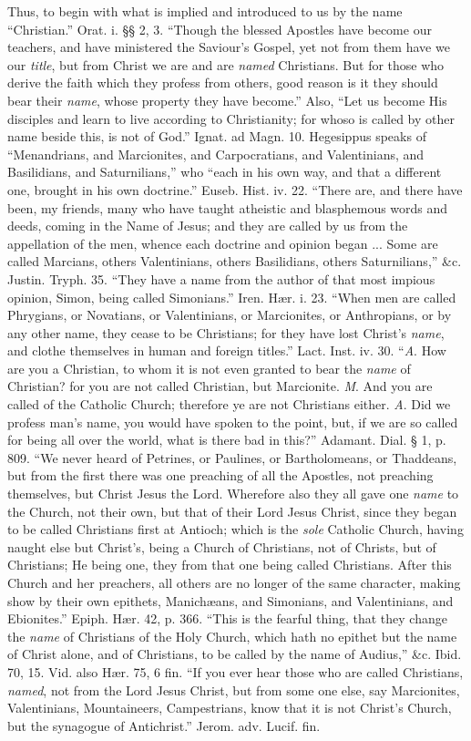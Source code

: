 Thus, to begin with what is implied and
introduced to us by the name ``Christian.'' Orat. i. §§ 2, 3. ``Though
the blessed Apostles have become our teachers, and have ministered the
Saviour's Gospel, yet not from them have we our \emph{title},
but from Christ we are and are \emph{named}
Christians. But for those who derive the faith which they
profess from others, good reason is it they should bear their \emph{name},
whose property they have become.'' Also, ``Let us become His
disciples and learn to live according to Christianity; for whoso is
called by other name beside this, is not of God.'' Ignat. ad Magn. 10.
Hegesippus speaks of ``Menandrians, and Marcionites, and Carpocratians,
and Valentinians, and Basilidians, and Saturnilians,'' who ``each in his
own way, and that a different one, brought in his own doctrine.'' Euseb.
Hist. iv. 22. ``There are, and there have been, my friends, many who
have taught atheistic and blasphemous words and deeds, coming in the
Name of Jesus; and they are called by us from the appellation of the
men, whence each doctrine and opinion began ... Some are called
Marcians, others Valentinians, others Basilidians, others Saturnilians,''
\&c. Justin. Tryph. 35. ``They have a name from the author of that
most impious opinion, Simon, being called Simonians.'' Iren. Hær. i.
23. ``When men are called Phrygians, or Novatians, or Valentinians, or
Marcionites, or Anthropians, or by any other name, they cease to be
Christians; for they have lost Christ's \emph{name},
and clothe themselves in human and foreign titles.'' Lact. Inst.
iv. 30. ``\emph{A}.
How are you a Christian, to whom it is not even granted to bear
the \emph{name} of Christian? for you are not called Christian, but Marcionite. \emph{M}.
And you are called of the Catholic Church; therefore ye are not
Christians either. \emph{A}. Did
we profess man's name, you would have spoken to the point, but,
if we are so called for being all over the world, what is there bad in
this?'' Adamant. Dial. § 1, p. 809. ``We never heard of Petrines, or
Paulines, or Bartholomeans, or Thaddeans, but from the first there was
one preaching of all the Apostles, not preaching themselves, but
Christ Jesus the Lord. Wherefore also they all gave one \emph{name}
to the Church, not their own, but that of their Lord Jesus
Christ, since they began to be called Christians first at Antioch;
which is the \emph{sole} Catholic
Church, having naught else but Christ's, being a Church of Christians,
not of Christs, but of Christians; He being one, they from that one
being called Christians. After this Church and her preachers, all
others are no longer of the same character, making show by their own
epithets, Manichæans, and Simonians, and Valentinians, and Ebionites.''
Epiph. Hær. 42, p. 366. ``This is the fearful thing, that they change
the \emph{name} of Christians of the Holy Church, which hath no epithet but the
name of Christ alone, and of Christians, to be called by the name of
Audius,'' \&c. Ibid. 70, 15. Vid. also Hær. 75, 6 fin. ``If you ever
hear those who are called Christians, \emph{named},
not from the Lord Jesus Christ, but from some one else, say
Marcionites, Valentinians, Mountaineers, Campestrians, know that it is
not Christ's Church, but the synagogue of Antichrist.'' Jerom. adv.
Lucif. fin.

